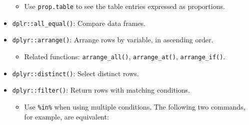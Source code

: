 \documentclass[
]{book}
\newenvironment{Shaded}{\begin{snugshade}}{\end{snugshade}}
\newcommand{\KeywordTok}[1]{\textcolor[rgb]{0.13,0.29,0.53}{\textbf{#1}}}
\newcommand{\NormalTok}[1]{#1}
\newcommand{\OperatorTok}[1]{\textcolor[rgb]{0.81,0.36,0.00}{\textbf{#1}}}
\newcommand{\StringTok}[1]{\textcolor[rgb]{0.31,0.60,0.02}{#1}}
\providecommand{\tightlist}{%
  \setlength{\itemsep}{0pt}\setlength{\parskip}{0pt}}
\begin{document}
\begin{itemize}
  \begin{itemize}
  \tightlist
  \item
    Use \texttt{prop.table} to see the table entries expressed as proportions.
  \end{itemize}
\item
  \texttt{dplr::all\_equal()}: Compare data frames.
\item
  \texttt{dplyr::arrange()}: Arrange rows by variable, in ascending order.

  \begin{itemize}
  \tightlist
  \item
    Related functions: \texttt{arrange\_all()}, \texttt{arrange\_at()}, \texttt{arrange\_if()}.
  \end{itemize}
\item
  \texttt{dplyr::distinct()}: Select distinct rows.
\item
  \texttt{dplyr::filter()}: Return rows with matching conditions.

  \begin{itemize}
  \tightlist
  \item
    Use \texttt{\%in\%} when using multiple \texttt{\textbar{}} conditions. The following two commands, for example, are equivalent:
  \end{itemize}
\end{itemize}

\begin{Shaded}
\end{Shaded}
\end{document}

